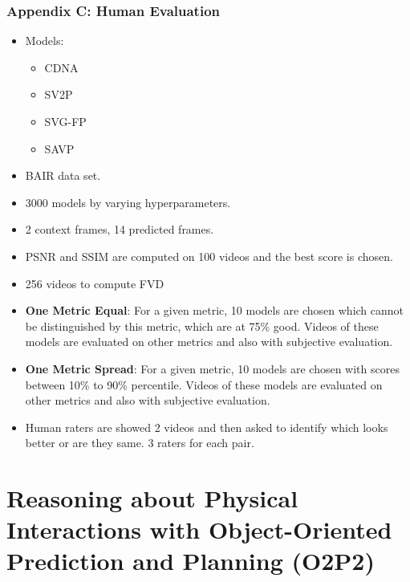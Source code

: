 \documentclass{article}
\begin{document}
    \subsubsection{Appendix C: Human Evaluation}\label{subsubsec:FVD_A_new_Metric_for_Video_Generation:appendix-c:-human-evaluation}
    \begin{itemize}
        \item Models:
        \begin{itemize}
            \item CDNA
            \item SV2P
            \item SVG-FP
            \item SAVP
        \end{itemize}
        \item BAIR data set.
        \item 3000 models by varying hyperparameters.
        \item 2 context frames, 14 predicted frames.
        \item PSNR and SSIM are computed on 100 videos and the best score is chosen.
        \item 256 videos to compute FVD
        \item \textbf{One Metric Equal}: For a given metric, 10 models are chosen which cannot be distinguished by this metric, which are at 75\% good.
        Videos of these models are evaluated on other metrics and also with subjective evaluation.
        \item \textbf{One Metric Spread}: For a given metric, 10 models are chosen with scores between 10\% to 90\% percentile.
        Videos of these models are evaluated on other metrics and also with subjective evaluation.
        \item Human raters are showed 2 videos and then asked to identify which looks better or are they same.
        3 raters for each pair.
    \end{itemize}
    \newpage


    \section{Reasoning about Physical Interactions with Object-Oriented Prediction and Planning (O2P2)}\label{sec:Reasoning_about_Physical_Interactions_with_Object_Oriented_Prediction_and_Planning_(O2P2)}
\end{document}
